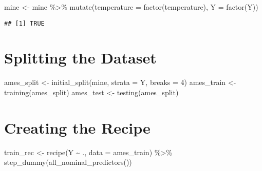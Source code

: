 \documentclass[
]{article}
\newenvironment{Shaded}{\begin{snugshade}}{\end{snugshade}}
\newcommand{\AttributeTok}[1]{\textcolor[rgb]{0.77,0.63,0.00}{#1}}
\newcommand{\DecValTok}[1]{\textcolor[rgb]{0.00,0.00,0.81}{#1}}
\newcommand{\FunctionTok}[1]{\textcolor[rgb]{0.00,0.00,0.00}{#1}}
\newcommand{\NormalTok}[1]{#1}
\newcommand{\OtherTok}[1]{\textcolor[rgb]{0.56,0.35,0.01}{#1}}
\newcommand{\SpecialCharTok}[1]{\textcolor[rgb]{0.00,0.00,0.00}{#1}}
\begin{document}
\begin{Shaded}
\begin{Highlighting}[]
\NormalTok{mine }\OtherTok{\textless{}{-}}\NormalTok{ mine }\SpecialCharTok{\%\textgreater{}\%}
\FunctionTok{mutate}\NormalTok{(}\AttributeTok{temperature =} \FunctionTok{factor}\NormalTok{(temperature),}
      \AttributeTok{Y =} \FunctionTok{factor}\NormalTok{(Y))}
\end{Highlighting}
\end{Shaded}

\begin{Shaded}
\end{Shaded}

\begin{verbatim}
## [1] TRUE
\end{verbatim}

\hypertarget{splitting-the-dataset}{%
\section{Splitting the Dataset}\label{splitting-the-dataset}}

\begin{Shaded}
\begin{Highlighting}[]
\NormalTok{ames\_split  }\OtherTok{\textless{}{-}} \FunctionTok{initial\_split}\NormalTok{(mine, }
                             \AttributeTok{strata =}\NormalTok{ Y,}
                             \AttributeTok{breaks =} \DecValTok{4}\NormalTok{)}
\NormalTok{ames\_train  }\OtherTok{\textless{}{-}} \FunctionTok{training}\NormalTok{(ames\_split)}
\NormalTok{ames\_test   }\OtherTok{\textless{}{-}} \FunctionTok{testing}\NormalTok{(ames\_split)}
\end{Highlighting}
\end{Shaded}

\hypertarget{creating-the-recipe}{%
\section{Creating the Recipe}\label{creating-the-recipe}}

\begin{Shaded}
\begin{Highlighting}[]
\NormalTok{train\_rec }\OtherTok{\textless{}{-}} \FunctionTok{recipe}\NormalTok{(Y }\SpecialCharTok{\textasciitilde{}}\NormalTok{ ., }\AttributeTok{data =}\NormalTok{ ames\_train) }\SpecialCharTok{\%\textgreater{}\%}
\FunctionTok{step\_dummy}\NormalTok{(}\FunctionTok{all\_nominal\_predictors}\NormalTok{())}
\end{Highlighting}
\end{Shaded}
\end{document}
